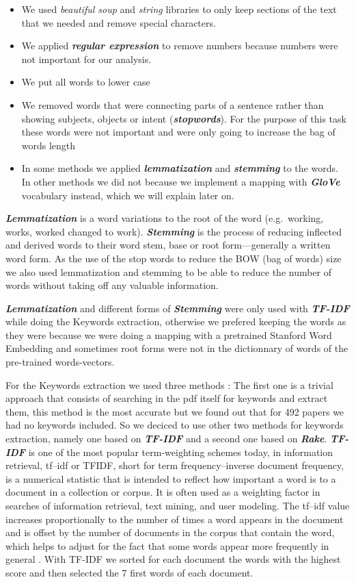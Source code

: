 \documentclass[article,twocolumn]{IEEEtran}
\begin{document}
\begin{itemize}
\item
  We used \emph{beautiful soup} and \emph{string} libraries to only keep
  sections of the text that we needed and remove special characters.
\item
  We applied \textbf{\emph{regular expression}} to remove numbers
  because numbers were not important for our analysis.
\item
  We put all words to lower case
\item
  We removed words that were connecting parts of a sentence rather than
  showing subjects, objects or intent (\textbf{\emph{stopwords}}). For
  the purpose of this task these words were not important and were only
  going to increase the bag of words length
\item
  In some methods we applied \textbf{\emph{lemmatization}} and
  \textbf{\emph{stemming}} to the words. In other methods we did not
  because we implement a mapping with \textbf{\emph{GloVe}} vocabulary
  instead, which we will explain later on.
\end{itemize}

\textbf{\emph{Lemmatization}} is a word variations to the root of the
word (e.g.~working, works, worked changed to work).
\textbf{\emph{Stemming}} is the process of reducing inflected and
derived words to their word stem, base or root form---generally a
written word form. As the use of the stop words to reduce the BOW (bag
of words) size we also used lemmatization and stemming to be able to
reduce the number of words without taking off any valuable information.

\textbf{\emph{Lemmatization}} and different forms of
\textbf{\emph{Stemming}} were only used with \textbf{\emph{TF-IDF}}
while doing the Keywords extraction, otherwise we prefered keeping the
words as they were because we were doing a mapping with a pretrained
Stanford Word Embedding \cite{GloVe_web} and sometimes root forms were
not in the dictionnary of words of the pre-trained words-vectors.

For the Keywords extraction we used three methods : The first one is a
trivial approach that consists of searching in the pdf itself for
keywords and extract them, this method is the most accurate but we found
out that for 492 papers we had no keywords included. So we deciced to
use other two methods for keywords extraction, namely one based on
\textbf{\emph{TF-IDF}} and a second one based on \textbf{\emph{Rake}}.
\textbf{\emph{TF-IDF}} is one of the most popular term-weighting schemes
today, in information retrieval, tf--idf or TFIDF, short for term
frequency--inverse document frequency, is a numerical statistic that is
intended to reflect how important a word is to a document in a
collection or corpus. It is often used as a weighting factor in searches
of information retrieval, text mining, and user modeling. The tf--idf
value increases proportionally to the number of times a word appears in
the document and is offset by the number of documents in the corpus that
contain the word, which helps to adjust for the fact that some words
appear more frequently in general \cite{Tf-idf}. With TF-IDF we sorted
for each document the words with the highest score and then selected the
7 first words of each document.
\end{document}
